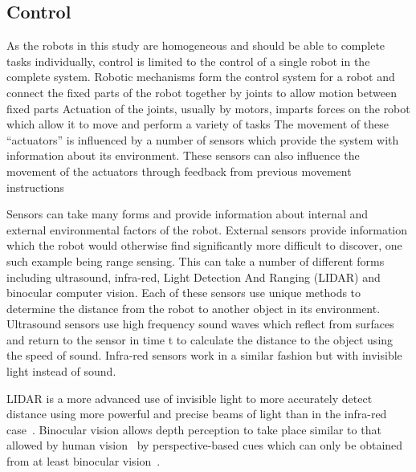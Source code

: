 \subsection{Control}\label{litreview/robotics/control}  
As the robots in this study are homogeneous and should be able to complete tasks individually, control is limited to the control of a single robot in the complete system. Robotic mechanisms form the control system for a robot and connect the fixed parts of the robot together by joints to allow motion between fixed parts%
Actuation of the joints, usually by motors, imparts forces on the robot which allow it to move and perform a variety of tasks%
The movement of these ``actuators'' is influenced by a number of sensors which provide the system with information about its environment. These sensors can also influence the movement of the actuators through feedback from previous movement instructions%

Sensors can take many forms and provide information about internal and external environmental factors of the robot. External sensors provide information which the robot would otherwise find significantly more difficult to discover, one such example being range sensing. This can take a number of different forms including ultrasound, infra-red, Light Detection And Ranging (LIDAR) and binocular computer vision. Each of these sensors use unique methods to determine the distance from the robot to another object in its environment. Ultrasound sensors use high frequency sound waves which reflect from surfaces and return to the sensor in time t to calculate the distance to the object using the speed of sound. Infra-red sensors work in a similar fashion but with invisible light instead of sound. 

LIDAR is a more advanced use of invisible light to more accurately detect distance using more powerful and precise beams of light than in the infra-red case~\cite{http://www.lidar-uk.com/how-lidar-works/}. Binocular vision allows depth perception to take place similar to that allowed by human vision~\cite{https://www.ncbi.nlm.nih.gov/pubmed/15471592} by perspective-based cues which can only be obtained from at least binocular vision~\cite{
https://www.cl.cam.ac.uk/techreports/UCAM-CL-TR-546.pdf}. 

